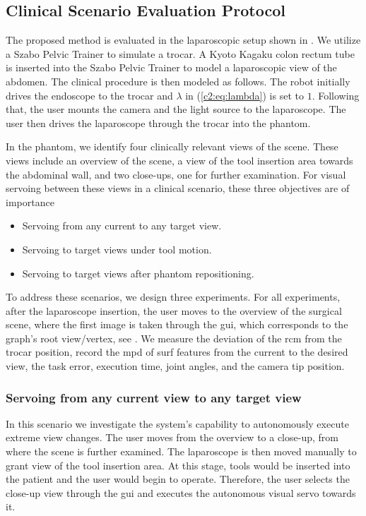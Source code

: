 
\subsection{Clinical Scenario Evaluation Protocol}
\label{c2:sec:clin_protocol}

The proposed method is evaluated in the laparoscopic setup shown in . We utilize a Szabo Pelvic Trainer to simulate a trocar. A Kyoto Kagaku colon rectum tube is inserted into the Szabo Pelvic Trainer to model a laparoscopic view of the abdomen. The clinical procedure is then modeled as follows. The robot initially drives the endoscope to the trocar and $\lambda$ in (\eqref{c2:eq:lambda}) is set to $1$. Following that, the user mounts the camera and the light source to the laparoscope. The user then drives the laparoscope through the trocar into the phantom.

In the phantom, we identify four clinically relevant views of the scene. These views include an overview of the scene, a view of the tool insertion area towards the abdominal wall, and two close-ups, one for further examination. For visual servoing between these views in a clinical scenario, these three objectives are of importance

\begin{itemize}
    \item Servoing from any current to any target view.
    \item Servoing to target views under tool motion.
    \item Servoing to target views after phantom repositioning.
\end{itemize}

To address these scenarios, we design three experiments. For all experiments, after the laparoscope insertion, the user moves to the overview of the surgical scene, where the first image is taken through the \gls{gui}, which corresponds to the graph's root view/vertex, see . We measure the deviation of the \gls{rcm} from the trocar position, record the \gls{mpd} of \gls{surf} features from the current to the desired view, the task error, execution time, joint angles, and the camera tip position.

\subsubsection{Servoing from any current view to any target view}
\label{c2:sec:clin_protocol_any}
In this scenario we investigate the system's capability to autonomously execute extreme view changes. The user moves from the overview to a close-up, from where the scene is further examined. The laparoscope is then moved manually to grant view of the tool insertion area. At this stage, tools would be inserted into the patient and the user would begin to operate. Therefore, the user selects the close-up view through the \gls{gui} and executes the autonomous visual servo towards it.

